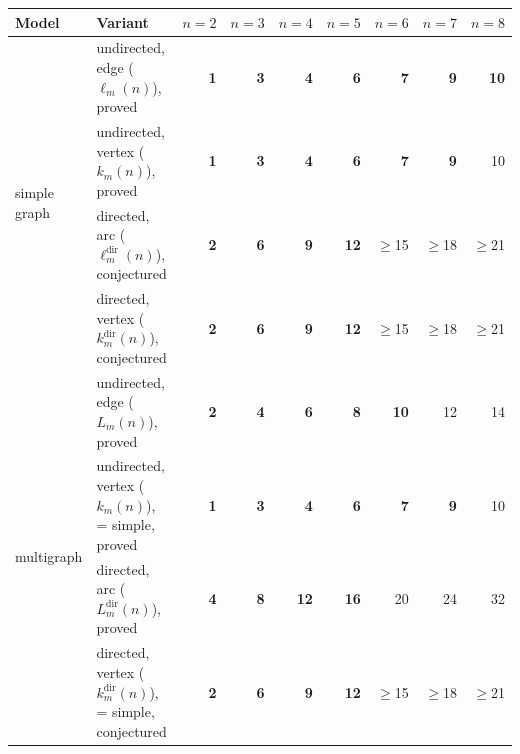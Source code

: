 \begin{tabular}{llrrrrrrr}
\toprule
Model & Variant & $n=2$ & $n=3$ & $n=4$ & $n=5$ & $n=6$ & $n=7$ & $n=8$ \\
\midrule
\multirow{4}{*}{simple graph} & undirected, edge ($\ell_m(n)$), \textcolor{vtProved}{proved} & \textcolor{vtExact}{\textbf{1}} & \textcolor{vtExact}{\textbf{3}} & \textcolor{vtExact}{\textbf{4}} & \textcolor{vtExact}{\textbf{6}} & \textcolor{vtExact}{\textbf{7}} & \textcolor{vtExact}{\textbf{9}} & \textcolor{vtExact}{\textbf{10}} \\
 & undirected, vertex ($k_m(n)$), \textcolor{vtProved}{proved} & \textcolor{vtExact}{\textbf{1}} & \textcolor{vtExact}{\textbf{3}} & \textcolor{vtExact}{\textbf{4}} & \textcolor{vtExact}{\textbf{6}} & \textcolor{vtExact}{\textbf{7}} & \textcolor{vtExact}{\textbf{9}} & \textcolor{vtProved}{10} \\
 & directed, arc ($\ell_m^{\mathrm{dir}}(n)$), \textcolor{vtConjectured}{conjectured} & \textcolor{vtExact}{\textbf{2}} & \textcolor{vtExact}{\textbf{6}} & \textcolor{vtExact}{\textbf{9}} & \textcolor{vtExact}{\textbf{12}} & \textcolor{vtConjectured}{$\ge$15} & \textcolor{vtConjectured}{$\ge$18} & \textcolor{vtConjectured}{$\ge$21} \\
 & directed, vertex ($k_m^{\mathrm{dir}}(n)$), \textcolor{vtConjectured}{conjectured} & \textcolor{vtExact}{\textbf{2}} & \textcolor{vtExact}{\textbf{6}} & \textcolor{vtExact}{\textbf{9}} & \textcolor{vtExact}{\textbf{12}} & \textcolor{vtConjectured}{$\ge$15} & \textcolor{vtConjectured}{$\ge$18} & \textcolor{vtConjectured}{$\ge$21} \\
\midrule
\multirow{4}{*}{multigraph} & undirected, edge ($L_m(n)$), \textcolor{vtProved}{proved} & \textcolor{vtExact}{\textbf{2}} & \textcolor{vtExact}{\textbf{4}} & \textcolor{vtExact}{\textbf{6}} & \textcolor{vtExact}{\textbf{8}} & \textcolor{vtExact}{\textbf{10}} & \textcolor{vtProved}{12} & \textcolor{vtProved}{14} \\
 & undirected, vertex ($k_m(n)$), \textcolor{vtProved}{= simple, proved} & \textcolor{vtExact}{\textbf{1}} & \textcolor{vtExact}{\textbf{3}} & \textcolor{vtExact}{\textbf{4}} & \textcolor{vtExact}{\textbf{6}} & \textcolor{vtExact}{\textbf{7}} & \textcolor{vtExact}{\textbf{9}} & \textcolor{vtProved}{10} \\
 & directed, arc ($L_m^{\mathrm{dir}}(n)$), \textcolor{vtProved}{proved} & \textcolor{vtExact}{\textbf{4}} & \textcolor{vtExact}{\textbf{8}} & \textcolor{vtExact}{\textbf{12}} & \textcolor{vtExact}{\textbf{16}} & \textcolor{vtProved}{20} & \textcolor{vtProved}{24} & \textcolor{vtProved}{32} \\
 & directed, vertex ($k_m^{\mathrm{dir}}(n)$), \textcolor{vtConjectured}{= simple, conjectured} & \textcolor{vtExact}{\textbf{2}} & \textcolor{vtExact}{\textbf{6}} & \textcolor{vtExact}{\textbf{9}} & \textcolor{vtExact}{\textbf{12}} & \textcolor{vtConjectured}{$\ge$15} & \textcolor{vtConjectured}{$\ge$18} & \textcolor{vtConjectured}{$\ge$21} \\
\bottomrule
\end{tabular}
